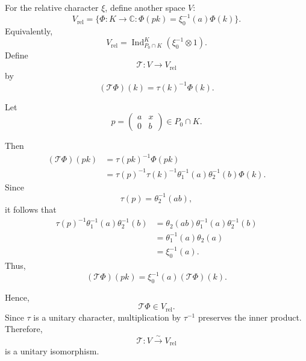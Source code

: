 \documentclass[11pt]{amsart}
\theoremstyle{definition}
\numberwithin{equation}{section}
\begin{document}
	For the relative character \(\xi\), define another space \(V\):
	\[
	V_{\mathrm{rel}} = \{ \Phi : K \longrightarrow \mathbb{C} : \Phi(pk) = \xi_0^{-1}(a)\Phi(k) \}.
	\]
	Equivalently,
	\[
	V_{\mathrm{rel}} = \operatorname{Ind}_{P_0 \cap K}^K (\xi_0^{-1} \otimes 1).
	\]
	Define
	\[
	\mathcal{T} : V \longrightarrow V_{\mathrm{rel}}
	\]
	by
	\[
	(\mathcal{T}\Phi)(k) = \tau(k)^{-1}\Phi(k).
	\]
	
	\noindent Let
	\[
	p = \begin{pmatrix} a & x \\ 0 & b \end{pmatrix} \in P_0 \cap K.
	\]
	
	\noindent Then
	\begin{align*}
		(\mathcal{T}\Phi)(pk) &= \tau(pk)^{-1}\Phi(pk) \\
		&= \tau(p)^{-1}\tau(k)^{-1}\theta_1^{-1}(a)\theta_2^{-1}(b)\Phi(k).
	\end{align*}
	\noindent Since
	\[
	\tau(p) = \theta_2^{-1}(ab),
	\]
	it follows that
	\begin{align*}
		\tau(p)^{-1}\theta_1^{-1}(a)\theta_2^{-1}(b) &= \theta_2(ab)\theta_1^{-1}(a)\theta_2^{-1}(b) \\
		&= \theta_1^{-1}(a)\theta_2(a) \\
		&= \xi_0^{-1}(a).
	\end{align*}
	\noindent Thus,
	\[
	(\mathcal{T}\Phi)(pk) = \xi_0^{-1}(a)(\mathcal{T}\Phi)(k).
	\]
	
	\noindent Hence,
	\[
	\mathcal{T}\Phi \in V_{\mathrm{rel}}.
	\]
	\noindent Since \(\tau\) is a unitary character, multiplication by \(\tau^{-1}\) preserves the inner product. Therefore,
	\[
	\mathcal{T} : V\xrightarrow{\sim} V_{\mathrm{rel}}
	\]
	is a unitary isomorphism.
	
\end{document}
